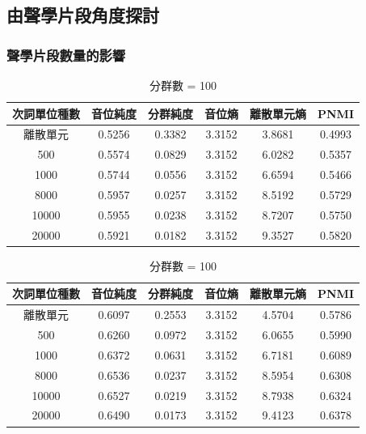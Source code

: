 \subsection{由聲學片段角度探討}
{
\subsubsection{聲學片段數量的影響}


{
\begin{table}[!htbp]
    \centering
    \begin{subtable}[t]{\textwidth}
        \centering
        \begin{tabular}{|c|c|c|c|c|c|} \hline 
                次詞單位種數& 音位純度 & 分群純度 & 音位熵 & 離散單元熵 &    PNMI \\ \hline 
離散單元& 0.5256& 0.3382& 3.3152& 3.8681& 0.4993\\ \hline 
                   500  &   0.5574   &  0.0829 &   3.3152  &  6.0282 & 0.5357 \\ \hline %
                  1000  &   0.5744   &  0.0556 &   3.3152  &  6.6594 & 0.5466 \\ \hline %
                  8000  &   0.5957   &  0.0257 &   3.3152  &  8.5192 & 0.5729 \\ \hline %
                 10000  &   0.5955   &  0.0238 &   3.3152  &  8.7207 & 0.5750 \\ \hline %
                 20000  &   0.5921   &  0.0182 &   3.3152  &  9.3527 & 0.5820 \\ \hline %
        \end{tabular}
\caption{分群數 = 50}
        \label{tab:ch4-hubert-phn-clu050-}
    \end{subtable}        
    \jefftablesep        
    \begin{subtable}[t]{\textwidth}
        \centering
        \begin{tabular}{|c|c|c|c|c|c|} \hline 
                次詞單位種數& 音位純度 & 分群純度 & 音位熵 & 離散單元熵 &    PNMI \\ \hline 
離散單元& 0.6097& 0.2553& 3.3152& 4.5704& 0.5786\\ \hline 
                   500  &   0.6260   &  0.0972 &   3.3152  &  6.0655 & 0.5990 \\ \hline %
                  1000  &   0.6372   &  0.0631 &   3.3152  &  6.7181 & 0.6089 \\ \hline %
                  8000  &   0.6536   &  0.0237 &   3.3152  &  8.5954 & 0.6308 \\ \hline %
                 10000  &   0.6527   &  0.0219 &   3.3152  &  8.7938 & 0.6324 \\ \hline %
                 20000  &   0.6490   &  0.0173 &   3.3152  &  9.4123 & 0.6378 \\ \hline %
        \end{tabular}
\caption{分群數 = 100}
        \label{tab:ch4-hubert-phn-clu100-}
    \end{subtable}        



\end{table}}}
